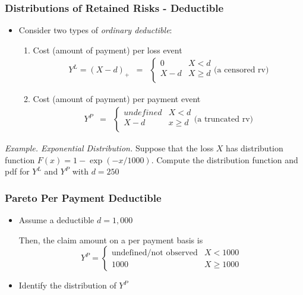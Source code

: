 \documentclass{beamer}
\begin{document}
\begin{frame}[shrink=2]
\frametitle{Distributions of Retained Risks - Deductible}
\begin{itemize}
\item Consider two types of \textit{ordinary deductible}: \vspace{2mm}

\begin{enumerate}
\item Cost (amount of payment) per loss event
  \begin{eqnarray*}
Y^L=(X-d)_+&=&
\left \{
\begin{array}{cc}
0 & X<d\\
X-d & X\ge d\\
\end{array}
\right.\text{(a censored rv)}
  \end{eqnarray*} \vspace{2mm}

\item Cost (amount of payment) per payment event
  \begin{eqnarray*}
Y^P &=&
\left \{
\begin{array}{cc}
undefined & X<d\\
X-d & x\ge d\\
\end{array}
\right. \text{(a truncated rv)}
  \end{eqnarray*}
\end{enumerate}
\end{itemize} \vspace{2mm}

\textit{Example. Exponential Distribution.} Suppose that the loss
$X$ has distribution function $F(x) = 1-\exp{(-x/1000)}$. Compute
the distribution function and pdf for $Y^L$ and $Y^P$ with $d=250$
\end{frame}

\begin{frame}[shrink=2]
\frametitle{Pareto Per Payment Deductible}
\begin{itemize}
\item Assume a deductible $d = 1,000$ \vspace{2mm}

Then, the claim amount on a per payment basis is
\begin{equation*}
Y^{P} =
\begin{cases}
\text{undefined/not observed} & X < 1000\\
1000 & X \ge 1000
\end{cases}
\end{equation*} \vspace{2mm}

\item Identify the distribution of $Y^P$
\end{itemize}
\end{frame}
\end{document}

